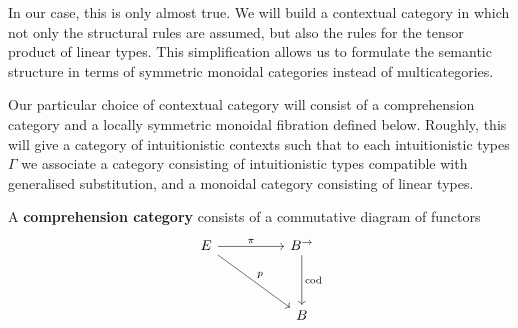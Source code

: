 In our case, this is only almost true. We will build a contextual category in which not only the structural rules are assumed, but also the rules for the tensor product of linear types. This simplification allows us to formulate the semantic structure in terms of symmetric monoidal categories instead of multicategories.

Our particular choice of contextual category will consist of a comprehension category and a locally symmetric monoidal fibration defined below. Roughly, this will give a category of intuitionistic contexts such that to each intuitionistic types $\Gamma$ we associate a category consisting of intuitionistic types compatible with generalised substitution, and a monoidal category consisting of linear types.
\begin{defn}
A \textbf{comprehension category} consists of a commutative diagram of functors
\[
\ti
E \ar[rd, "p"] \ar[r, "\pi"]  & B^{\to} \ar[d, "\text{cod}"]\\
& B
\kz
\]


\end{defn}
